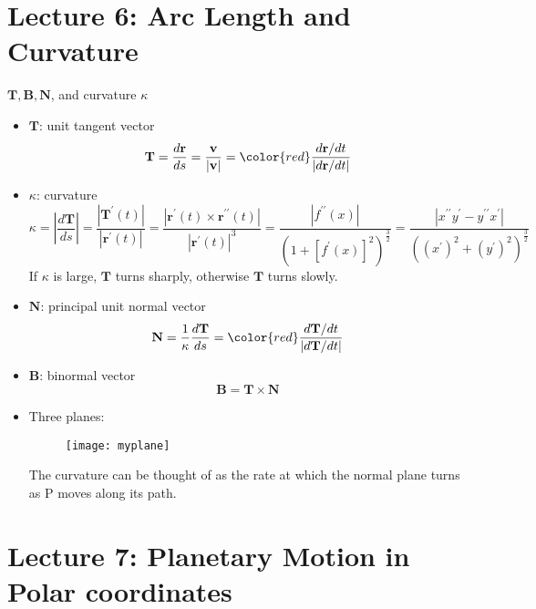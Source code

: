 \documentclass[10pt]{beamer}
\begin{document}
\section{Lecture 6: Arc Length and Curvature}

\begin{frame}[allowframebreaks]{$\mathbf{T}, \mathbf{B}, \mathbf{N}$, and curvature $\kappa$}
	
	\begin{itemize}
		\item $\mathbf{T}$: unit tangent vector
		$$\mathbf{T} = \dfrac{d\mathbf{r}}{ds} = \dfrac{\mathbf{v}}{|\mathbf{v}|} = {\color{red}\dfrac{d\mathbf{r}/dt}{|d\mathbf{r}/dt|}}$$
		
		\item $\kappa$: curvature
		$$\kappa = \left\vert \dfrac{d\mathbf{T}}{ds} \right\vert = \dfrac{|\mathbf{T}^\prime(t)|}{|\mathbf{r}^\prime(t)|} = \dfrac{|\mathbf{r}^\prime(t)\times\mathbf{r}^{\prime\prime}(t)|}{|\mathbf{r}^\prime(t)|^3} = \dfrac{|f^{\prime\prime}(x)|}{(1 + [f^\prime(x)]^2)^{\frac{3}{2}}} = \dfrac{|x^{\prime\prime}y^\prime - y^{\prime\prime}x^\prime|}{((x^\prime)^2 + (y^\prime)^2)^\frac{3}{2}}$$
		If $\kappa$ is large, $\mathbf{T}$ turns sharply, otherwise $\mathbf{T}$ turns slowly.
		
		\item $\mathbf{N}$: principal unit normal vector
		$$\mathbf{N} = \dfrac{1}{\kappa}\dfrac{d\mathbf{T}}{ds} = {\color{red}\dfrac{d\mathbf{T}/dt}{|d\mathbf{T}/dt|}}$$
		
			\item $\mathbf{B}$: binormal vector
			$$\mathbf{B} = \mathbf{T}\times \mathbf{N}$$
			
			\item Three planes:
			\begin{figure}[H]
				\centering
			\texttt{[image: myplane]}
			\end{figure}
			\noindent 
			The curvature can be thought of as the rate at which
			the normal plane turns as P moves along its path.
	\end{itemize}
		
\end{frame}
















\section{Lecture 7: Planetary Motion in Polar coordinates}
\end{document}
